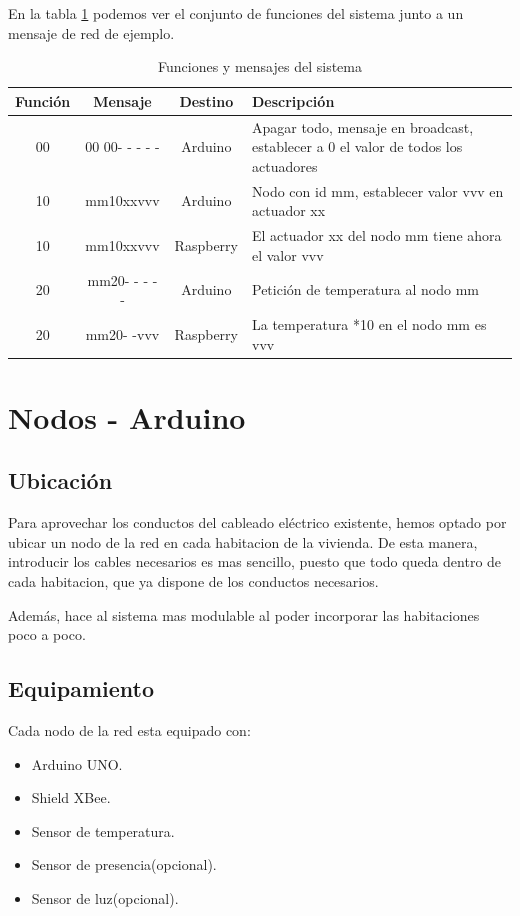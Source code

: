 En la tabla \ref{tab:funcSistema} podemos ver el conjunto de funciones del sistema junto a un mensaje de red de ejemplo.


\begin{table}[h]
    \centering
    \begin{tabular}{cccp{6cm}}
        
        Función & Mensaje   & Destino & Descripción     \\ \toprule
        00      & 00 00- - - - -& Arduino & Apagar todo, mensaje en broadcast, establecer a 0 el valor de todos los actuadores \\ \midrule
        10      & mm10xxvvv & Arduino & Nodo con id mm, establecer valor vvv en actuador xx\\ \midrule
        10      & mm10xxvvv & Raspberry & El actuador xx del nodo mm tiene ahora el valor vvv \\ \midrule
        20      & mm20- - - - - & Arduino &  Petición de temperatura al nodo mm \\ \midrule
        20      & mm20- -vvv & Raspberry &  La temperatura *10 en el nodo mm es vvv \\ \midrule            
    \end{tabular}
    \caption{Funciones y mensajes del sistema}
    \label{tab:funcSistema}
\end{table} 



\section{Nodos - Arduino}
\subsection{Ubicación}
Para aprovechar los conductos del cableado eléctrico existente, hemos optado por ubicar un nodo de la red en cada habitacion de la vivienda. De esta manera, introducir los cables necesarios es mas sencillo, puesto que todo queda dentro de cada habitacion, que ya dispone de los conductos necesarios.

 Además, hace al sistema mas modulable al poder incorporar las habitaciones poco a poco.

\subsection{Equipamiento}
Cada nodo de la red esta equipado con:
\begin{itemize}
    \item Arduino UNO.
    \item Shield XBee.
    \item Sensor de temperatura.
    \item Sensor de presencia(opcional).
    \item Sensor de luz(opcional).
\end{itemize}

